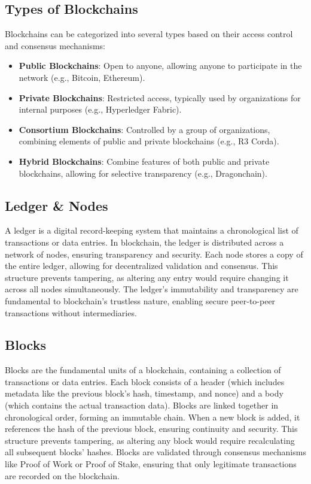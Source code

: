 \documentclass[12pt, a4paper]{article}
\begin{document}
\subsection{Types of Blockchains}
Blockchains can be categorized into several types based on their access control and consensus mechanisms:
\begin{itemize}
    \item \textbf{Public Blockchains}: Open to anyone, allowing anyone to participate in the network (e.g., Bitcoin, Ethereum).
    \item \textbf{Private Blockchains}: Restricted access, typically used by organizations for internal purposes (e.g., Hyperledger Fabric).
    \item \textbf{Consortium Blockchains}: Controlled by a group of organizations, combining elements of public and private blockchains (e.g., R3 Corda).
    \item \textbf{Hybrid Blockchains}: Combine features of both public and private blockchains, allowing for selective transparency (e.g., Dragonchain).
\end{itemize}
\subsection{Ledger \& Nodes}
A ledger is a digital record-keeping system that maintains a chronological list of transactions or data entries. In blockchain, the ledger is distributed across a network of nodes, ensuring transparency and security. Each node stores a copy of the entire ledger, allowing for decentralized validation and consensus. This structure prevents tampering, as altering any entry would require changing it across all nodes simultaneously. The ledger's immutability and transparency are fundamental to blockchain's trustless nature, enabling secure peer-to-peer transactions without intermediaries.
\subsection{Blocks}
Blocks are the fundamental units of a blockchain, containing a collection of transactions or data entries. Each block consists of a header (which includes metadata like the previous block's hash, timestamp, and nonce) and a body (which contains the actual transaction data). Blocks are linked together in chronological order, forming an immutable chain. When a new block is added, it references the hash of the previous block, ensuring continuity and security. This structure prevents tampering, as altering any block would require recalculating all subsequent blocks' hashes. Blocks are validated through consensus mechanisms like Proof of Work or Proof of Stake, ensuring that only legitimate transactions are recorded on the blockchain.
\end{document}

